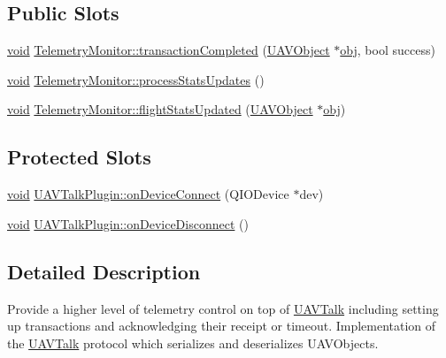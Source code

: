 \subsection*{Public Slots}
\begin{DoxyCompactItemize}
\item 
\hyperlink{group___u_a_v_objects_plugin_ga444cf2ff3f0ecbe028adce838d373f5c}{void} \hyperlink{group___u_a_v_talk_plugin_ga2b5452341c351cd2d67c46469b855607}{Telemetry\-Monitor\-::transaction\-Completed} (\hyperlink{class_u_a_v_object}{U\-A\-V\-Object} $\ast$\hyperlink{glext_8h_a0c0d4701a6c89f4f7f0640715d27ab26}{obj}, bool success)
\item 
\hyperlink{group___u_a_v_objects_plugin_ga444cf2ff3f0ecbe028adce838d373f5c}{void} \hyperlink{group___u_a_v_talk_plugin_ga2e16b3d1a298f851879d22749d1e38e9}{Telemetry\-Monitor\-::process\-Stats\-Updates} ()
\item 
\hyperlink{group___u_a_v_objects_plugin_ga444cf2ff3f0ecbe028adce838d373f5c}{void} \hyperlink{group___u_a_v_talk_plugin_ga31c0b7ae632d68a5584d1f0696e35766}{Telemetry\-Monitor\-::flight\-Stats\-Updated} (\hyperlink{class_u_a_v_object}{U\-A\-V\-Object} $\ast$\hyperlink{glext_8h_a0c0d4701a6c89f4f7f0640715d27ab26}{obj})
\end{DoxyCompactItemize}
\subsection*{Protected Slots}
\begin{DoxyCompactItemize}
\item 
\hyperlink{group___u_a_v_objects_plugin_ga444cf2ff3f0ecbe028adce838d373f5c}{void} \hyperlink{group___u_a_v_talk_plugin_ga496d6211736a7cfd5cee129eb2b8ad95}{U\-A\-V\-Talk\-Plugin\-::on\-Device\-Connect} (Q\-I\-O\-Device $\ast$dev)
\item 
\hyperlink{group___u_a_v_objects_plugin_ga444cf2ff3f0ecbe028adce838d373f5c}{void} \hyperlink{group___u_a_v_talk_plugin_ga1ac9b2c0c21d66d603c639183ebcd7db}{U\-A\-V\-Talk\-Plugin\-::on\-Device\-Disconnect} ()
\end{DoxyCompactItemize}


\subsection{Detailed Description}
Provide a higher level of telemetry control on top of \hyperlink{class_u_a_v_talk}{U\-A\-V\-Talk} including setting up transactions and acknowledging their receipt or timeout. Implementation of the \hyperlink{class_u_a_v_talk}{U\-A\-V\-Talk} protocol which serializes and deserializes U\-A\-V\-Objects.

